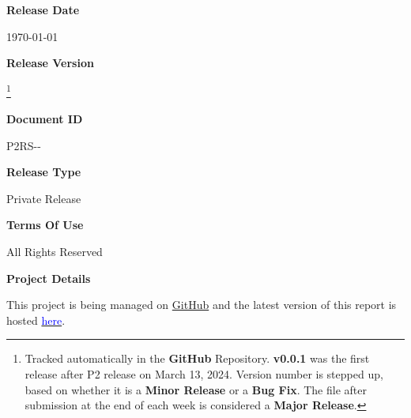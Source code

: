 \begin{titlepage}
{        \vspace{0.24cm}
        \textbf{\textcolor{tuberlindarkgray}{Release Date}}\par \vspace{0.12cm}
        {\today}

        \vspace{0.24cm}
        \textbf{\textcolor{tuberlindarkgray}{Release Version}}\par \vspace{0.12cm}
        \textbf{}\footnote{Tracked automatically in the \textbf{GitHub} Repository.
                  \textbf{v0.0.1} was the first release after P2 release on March 13, 2024.
                  Version number is stepped up, based on whether it is a \textbf{Minor Release} or a \textbf{Bug Fix}.
                  The file after submission at the end of each week is considered a \textbf{Major Release}.}\par
    \vspace{0.24cm}
        \textbf{\textcolor{tuberlindarkgray}{Document ID}}\par \vspace{0.12cm}
        {P2RS-\mydate-}\par
        \vspace{0.24cm}
        \textbf{\textcolor{tuberlindarkgray}{Release Type}}\par \vspace{0.12cm}
        {Private Release}

        \vspace{0.24cm}
        \textbf{\textcolor{tuberlindarkgray}{Terms Of Use}}\par \vspace{0.12cm}
        {All Rights Reserved}

        \vspace{0.24cm}
        \textbf{\textcolor{tuberlindarkgray}{Project Details}}\par \vspace{0.12cm}
        {This project is being managed on \href{https://github.com/ELP305-Cleaning-Machine}{GitHub} and the latest version of this report is hosted \href{https://2nav.github.io/TribeC/}{\textcolor{blue}{here}}.}
    }
\end{titlepage}
\afterpage{\restoregeometry}    
